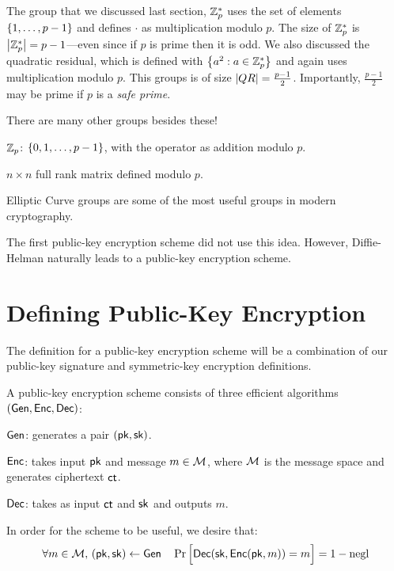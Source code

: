 The group that we discussed last section, $\mathbb{Z}_p^*$ uses the set of elements $\left\{ 1, \ldots, p-1 \right\}$ and defines $\cdot$ as multiplication modulo $p$. The size of $\mathbb{Z}_p^*$ is $\left| \mathbb{Z}_p^* \right| = p-1$---even since if $p$ is prime then it is odd. We also discussed the quadratic residual, which is defined with $\left\{ a^2: a \in \mathbb{Z}_p^* \right\}$ and again uses multiplication modulo $p$. This groups is of size $\left| QR \right| = \tfrac{p-1}{2}$. Importantly, $\tfrac{p-1}{2}$ may be prime if $p$ is a \emph{safe prime}.

There are many other groups besides these!
\begin{compactitem}
\item $\mathbb{Z}_p$: $\left\{ 0, 1, \ldots, p-1 \right\}$, with the operator as addition modulo $p$.
\item $n \times n$ full rank matrix defined modulo $p$.
\item Elliptic Curve groups are some of the most useful groups in modern cryptography.
\end{compactitem}

The first public-key encryption scheme did not use this idea. However, Diffie-Helman naturally leads to a public-key encryption scheme.

\section{Defining Public-Key Encryption}
The definition for a public-key encryption scheme will be a combination of our public-key signature and symmetric-key encryption definitions.

\begin{definition}
	A public-key encryption scheme consists of three efficient algorithms $(\mathsf{Gen}, \mathsf{Enc}, \mathsf{Dec})$:
	\begin{compactitem}
		\item $\mathsf{Gen}$: generates a pair $(\mathsf{pk}, {\mathsf{sk}})$.
		\item $\mathsf{Enc}$: takes input $\mathsf{pk}$ and message $m \in \mathcal{M}$, where $\mathcal{M}$ is the message space and generates ciphertext $\mathsf{ct}$.
		\item $\mathsf{Dec}$: takes as input $\mathsf{ct}$ and ${\mathsf{sk}}$ and outputs $m$.
	\end{compactitem}
\end{definition}

\begin{definition}
	In order for the scheme to be useful, we desire that:
	\[ \forall m \in \mathcal{M}, \, (\mathsf{pk}, {\mathsf{sk}}) \gets \mathsf{Gen} \quad \Pr\Big[ \mathsf{Dec}({\mathsf{sk}}, \mathsf{Enc}(\mathsf{pk}, m)) = m \Big] = 1 - \operatorname{negl} \]
\end{definition}


